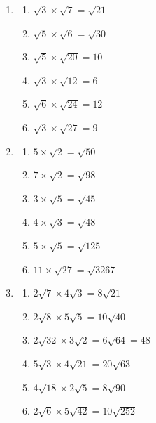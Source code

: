 \documentclass[a4paper,12pt]{article}
\begin{document}
\begin{enumerate}
	\item 
	\begin{multicols}{2}
		\begin{enumerate}
			\item $\displaystyle \sqrt{3}\times \sqrt{7}=\sqrt{21} $
			\item $\displaystyle \sqrt{5}\times \sqrt{6}=\sqrt{30} $
			\item $\displaystyle \sqrt{5}\times \sqrt{20}=10$
			\item $\displaystyle \sqrt{3}\times \sqrt{12}=6$
			\item $\displaystyle \sqrt{6}\times \sqrt{24}=12$
			\item $\displaystyle \sqrt{3}\times \sqrt{27}=9$		
		\end{enumerate}
	\end{multicols}
	\item 
	\begin{multicols}{2}
		\begin{enumerate}
			\item $\displaystyle 5\times \sqrt{2}=\sqrt{50} $
			\item $\displaystyle 7\times \sqrt{2}=\sqrt{98} $
			\item $\displaystyle 3\times \sqrt{5}=\sqrt{45}$
			\item $\displaystyle 4\times \sqrt{3}=\sqrt{48}$
			\item $\displaystyle 5\times \sqrt{5}=\sqrt{125}$
			\item $\displaystyle 11\times \sqrt{27}=\sqrt{3267}$		
		\end{enumerate}
	\end{multicols}
	\item 
	\begin{multicols}{2}
		\begin{enumerate}
			\item $\displaystyle 2\sqrt{7}\times 4\sqrt{3}=8\sqrt{21}$
			\item $\displaystyle 2\sqrt{8}\times 5\sqrt{5}=10\sqrt{40}$
			\item $\displaystyle 2\sqrt{32}\times 3\sqrt{2}=6\sqrt{64}=48$
			\item $\displaystyle 5\sqrt{3}\times 4\sqrt{21}=20\sqrt{63}$
			\item $\displaystyle 4\sqrt{18}\times 2\sqrt{5}=8\sqrt{90}$
			\item $\displaystyle 2\sqrt{6}\times 5\sqrt{42}=10\sqrt{252}$
		\end{enumerate}

\end{multicols}
\end{enumerate}
\end{document}
